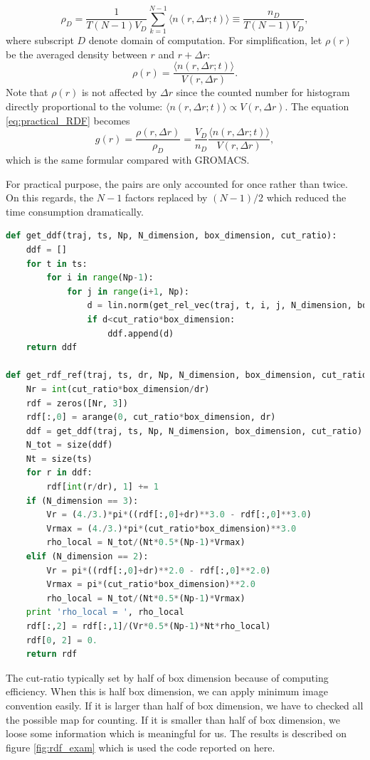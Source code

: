 \documentclass[10pt, a4paper]{report}
\begin{document}
\begin{appendices}
\begin{equation}
    \rho_{D} = \frac{1}{T(N-1)V_D}\sum_{k=1}^{N-1}\langle n(r, \Delta r;t)\rangle \equiv \frac{n_D}{T(N-1)V_D},
  \end{equation}
  where subscript $D$ denote domain of computation. 
  For simplification, let $\rho(r)$ be the averaged density between $r$ and $r+\Delta r$:
  \begin{equation}
    \rho(r) = \frac{\langle n(r, \Delta r; t)\rangle}{V(r, \Delta r)}. %
  \end{equation}
  Note that $\rho(r)$ is not affected by $\Delta r$ since the counted number for histogram directly proportional to the volume: $\langle n(r, \Delta r; t)\rangle \propto V(r, \Delta r)$.
  The equation \eqref{eq:practical_RDF} becomes
  \begin{equation}
    g(r) = \frac{\rho(r, \Delta r)}{\rho_D} = \frac{V_D}{n_D}\frac{\langle n(r, \Delta r; t)\rangle}{V(r, \Delta r)}, \label{eq:practical_RDF_refine}
  \end{equation}
  which is the same formular compared with GROMACS.
  

  For practical purpose, the pairs are only accounted for once rather than twice. On this regards, the $N-1$ factors replaced by $(N-1)/2$ which reduced the time consumption dramatically. 
  \begin{lstlisting}[language=Python,frame=single]
def get_ddf(traj, ts, Np, N_dimension, box_dimension, cut_ratio):
    ddf = []
    for t in ts:
        for i in range(Np-1):
            for j in range(i+1, Np):
                d = lin.norm(get_rel_vec(traj, t, i, j, N_dimension, box_dimension))
                if d<cut_ratio*box_dimension:
                    ddf.append(d)
    return ddf

def get_rdf_ref(traj, ts, dr, Np, N_dimension, box_dimension, cut_ratio):
    Nr = int(cut_ratio*box_dimension/dr)
    rdf = zeros([Nr, 3])
    rdf[:,0] = arange(0, cut_ratio*box_dimension, dr)
    ddf = get_ddf(traj, ts, Np, N_dimension, box_dimension, cut_ratio)
    N_tot = size(ddf)
    Nt = size(ts)
    for r in ddf:
        rdf[int(r/dr), 1] += 1
    if (N_dimension == 3):
        Vr = (4./3.)*pi*((rdf[:,0]+dr)**3.0 - rdf[:,0]**3.0)
        Vrmax = (4./3.)*pi*(cut_ratio*box_dimension)**3.0
        rho_local = N_tot/(Nt*0.5*(Np-1)*Vrmax)
    elif (N_dimension == 2):
        Vr = pi*((rdf[:,0]+dr)**2.0 - rdf[:,0]**2.0)
        Vrmax = pi*(cut_ratio*box_dimension)**2.0
        rho_local = N_tot/(Nt*0.5*(Np-1)*Vrmax)
    print 'rho_local = ', rho_local
    rdf[:,2] = rdf[:,1]/(Vr*0.5*(Np-1)*Nt*rho_local)
    rdf[0, 2] = 0. 
    return rdf
    \end{lstlisting}
    The cut-ratio typically set by half of box dimension because of computing efficiency. When this is half box dimension, we can apply minimum image convention easily. If it is larger than half of box dimension, we have to checked all the possible map for counting. If it is smaller than half of box dimension, we loose some information which is meaningful for us. 
    The results is described on figure \ref{fig:rdf_exam} which is used the code reported on here. 



\end{appendices}
\end{document}
